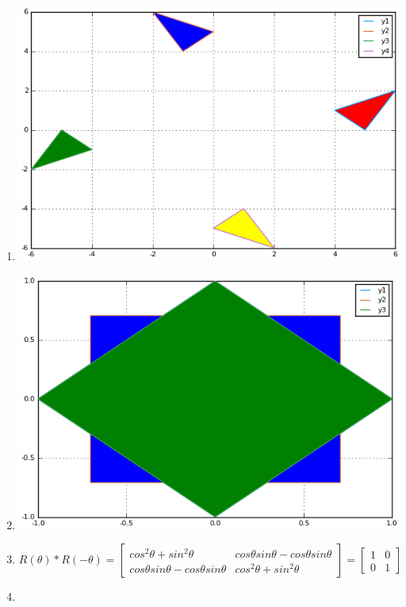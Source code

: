 \documentclass[]{article}
\begin{document}
\begin{enumerate}
\def\labelenumi{\arabic{enumi}.}
\item
\hfill \break
\includegraphics[width=\textwidth,keepaspectratio]{problem3partA.png}
\item
\hfill \break
\includegraphics[width=\textwidth,keepaspectratio]{problem3partB.png}
\item
\[ R(\theta) * R(-\theta) = \begin{bmatrix} 
cos^2\theta + sin^2\theta & cos\theta sin\theta - cos\theta sin\theta \\
cos\theta sin\theta - cos\theta sin\theta & cos^2\theta + sin^2\theta
\end{bmatrix} = \begin{bmatrix} 
1 & 0 \\
0 & 1
\end{bmatrix}
\]
\item

\end{enumerate}
\end{document}
